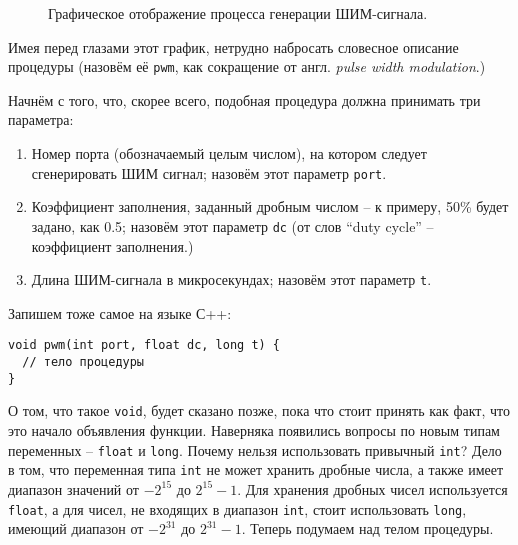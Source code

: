 \documentclass[../sparc.tex]{subfiles}
\begin{document}
\begin{figure}[ht]
  \caption{Графическое отображение процесса генерации ШИМ-сигнала.}
  \label{fig:pwm-graph}
\end{figure}

Имея перед глазами этот график, нетрудно набросать словесное описание процедуры
(назовём её \texttt{pwm}, как сокращение от англ. \emph{pulse width
modulation}.)

Начнём с того, что, скорее всего, подобная процедура должна принимать три
параметра:
\begin{enumerate}
\item Номер порта (обозначаемый целым числом), на котором следует сгенерировать
  ШИМ сигнал; назовём этот параметр \texttt{port}.
\item Коэффициент заполнения, заданный дробным числом -- к примеру, 50\% будет
  задано, как 0.5; назовём этот параметр \texttt{dc} (от слов ``duty cycle'' --
  коэффициент заполнения.)
\item Длина ШИМ-сигнала в микросекундах; назовём этот параметр
  \texttt{t}.
\end{enumerate}

Запишем тоже самое на языке С++:

\begin{verbatim}
void pwm(int port, float dc, long t) {
  // тело процедуры
}
\end{verbatim}

О том, что такое \texttt{void}, будет сказано позже, пока что стоит принять как
факт, что это начало объявления функции. Наверняка появились вопросы по новым
типам переменных -- \texttt{float} и \texttt{long}. Почему нельзя использовать
привычный \texttt{int}? Дело в том, что переменная типа \texttt{int} не может
хранить дробные числа, а также имеет диапазон значений от $-2^{15}$ до $2^{15} -
1$. Для хранения дробных чисел используется \texttt{float}, а для чисел, не
входящих в диапазон \texttt{int}, стоит использовать \texttt{long}, имеющий
диапазон от $-2^{31}$ до $2^{31} - 1$.  Теперь подумаем над телом процедуры.
\end{document}
